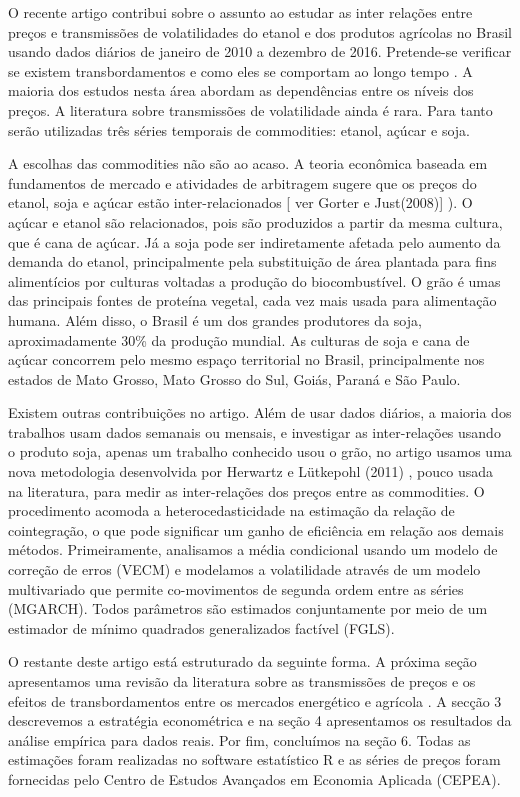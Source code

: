 \documentclass[a4paper,12pt] {article}
\begin{document}
O recente artigo contribui sobre o assunto ao estudar as inter relações  entre preços e transmissões de volatilidades do etanol e dos produtos agrícolas no Brasil usando dados diários de janeiro de 2010 a dezembro de 2016. Pretende-se verificar se existem transbordamentos e como eles se comportam ao longo tempo . A maioria dos estudos nesta área abordam as dependências entre os níveis dos preços. A literatura sobre transmissões de volatilidade ainda é rara. Para tanto serão utilizadas três séries temporais de commodities: etanol, açúcar e soja. 

A escolhas das commodities não são ao acaso. A teoria econômica baseada em fundamentos de mercado e atividades de arbitragem sugere que os preços do etanol, soja e açúcar estão inter-relacionados [ ver Gorter e Just(2008)] ). O açúcar e etanol são relacionados, pois são produzidos a partir da mesma cultura, que é cana de açúcar. Já a  soja pode ser indiretamente  afetada pelo aumento da demanda do etanol, principalmente pela substituição de área plantada para fins alimentícios por culturas voltadas a produção do biocombustível.  O grão é umas das principais fontes de proteína vegetal, cada vez mais usada para alimentação humana.  Além disso, o Brasil é um dos grandes produtores da soja, aproximadamente 30\% da produção mundial. As culturas de soja e cana de açúcar  concorrem pelo mesmo espaço territorial no Brasil, principalmente nos estados de Mato Grosso, Mato Grosso do Sul, Goiás, Paraná e São Paulo. 

Existem outras contribuições no artigo. Além de usar dados diários, a maioria dos trabalhos usam dados semanais ou mensais, e investigar as inter-relações usando o produto soja, apenas um trabalho conhecido usou o grão, no artigo usamos uma nova metodologia desenvolvida  por Herwartz e Lütkepohl (2011) , pouco usada na literatura, para medir as inter-relações dos preços entre as commodities. O procedimento  acomoda a heterocedasticidade na estimação da relação de cointegração, o que pode significar um ganho de eficiência em relação aos demais métodos. Primeiramente,  analisamos a média condicional usando um modelo de correção de erros (VECM) e modelamos a  volatilidade através de um modelo multivariado que permite co-movimentos de segunda ordem entre as séries (MGARCH).  Todos parâmetros  são estimados conjuntamente por meio de um estimador de mínimo quadrados generalizados factível (FGLS).

O restante deste artigo está estruturado da seguinte forma. A próxima seção apresentamos uma revisão da literatura sobre as transmissões de preços e os efeitos de transbordamentos entre os mercados energético e agrícola . A secção 3 descrevemos  a estratégia econométrica e na seção 4 apresentamos os resultados da análise empírica para dados reais. Por fim, concluímos na seção 6. Todas as estimações foram realizadas no software estatístico R e as séries de preços foram fornecidas pelo Centro de Estudos Avançados em Economia Aplicada (CEPEA).

 
\end{document}
